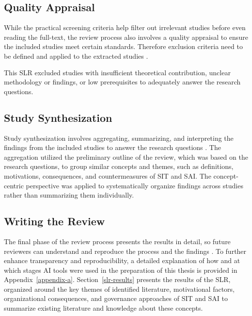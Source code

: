 \documentclass[12pt,oneside]{article}
\begin{document}
\subsection{Quality Appraisal} \label{quality-appraisal}

While the practical screening criteria help filter out irrelevant studies before even reading the full-text, the review process also involves a quality appraisal to ensure the included studies meet certain standards. Therefore exclusion criteria need to be defined and applied to the extracted studies \citep[884]{okoli2015guide}. 

This \ac{SLR} excluded studies with insufficient theoretical contribution, unclear methodology or findings, or low prerequisites to adequately answer the research questions.

\subsection{Study Synthesization} \label{study-synthesization}

Study synthesization involves aggregating, summarizing, and interpreting the findings from the included studies to answer the research questions \citep[899]{okoli2015guide}. The aggregation utilized the preliminary outline of the review, which was based on the research questions, to group similar concepts and themes, such as definitions, motivations, consequences, and countermeasures of \ac{SIT} and \ac{SAI}. The concept-centric perspective was applied to systematically organize findings across studies rather than summarizing them individually.

\subsection{Writing the Review} \label{writing-the-review}

The final phase of the review process presents the results in detail, so future reviewers can understand and reproduce the process and the findings \citep[901]{okoli2015guide}. To further enhance transparency and reproducibility, a detailed explanation of how and at which stages \ac{AI} tools were used in the preparation of this thesis is provided in Appendix~\ref{appendix-a}. Section~\ref{slr-results} presents the results of the \ac{SLR}, organized around the key themes of identified literature, motivational factors, organizational consequences, and governance approaches of \ac{SIT} and \ac{SAI} to summarize existing literature and knowledge about these concepts.
\end{document}

